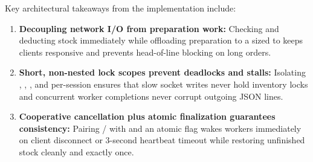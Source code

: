 \documentclass{../latex/utmreport}
\begin{document}
Key architectural takeaways from the implementation include:
\begin{enumerate}
  \item \textbf{Decoupling network I/O from preparation work:} Checking and deducting stock immediately while offloading preparation to a  sized to  keeps clients responsive and prevents head-of-line blocking on long orders.
  \item \textbf{Short, non-nested lock scopes prevent deadlocks and stalls:} Isolating , , , and per-session  ensures that slow socket writes never hold inventory locks and concurrent worker completions never corrupt outgoing JSON lines.
  \item \textbf{Cooperative cancellation plus atomic finalization guarantees consistency:} Pairing / with  and an atomic  flag wakes workers immediately on client disconnect or 3-second heartbeat timeout while restoring unfinished stock cleanly and exactly once.
\end{enumerate}
\end{document}
